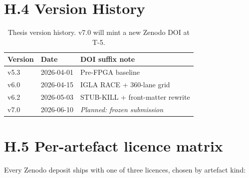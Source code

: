 \section*{H.4 Version History}

\begin{table}[h]
\centering
\begin{tabular}{lll}
\toprule
\textbf{Version} & \textbf{Date} & \textbf{DOI suffix note} \\
\midrule
v5.3 & 2026-04-01 & Pre-FPGA baseline \\
v6.0 & 2026-04-15 & IGLA RACE + 360-lane grid \\
v6.2 & 2026-05-03 & STUB-KILL + front-matter rewrite \\
v7.0 & 2026-06-10 & \emph{Planned: frozen submission} \\
\bottomrule
\end{tabular}
\caption{Thesis version history. v7.0 will mint a new Zenodo DOI at T-5.}
\end{table}



\section*{H.5 Per-artefact licence matrix}

\noindent Every Zenodo deposit ships with one of three licences, chosen by
artefact kind:


